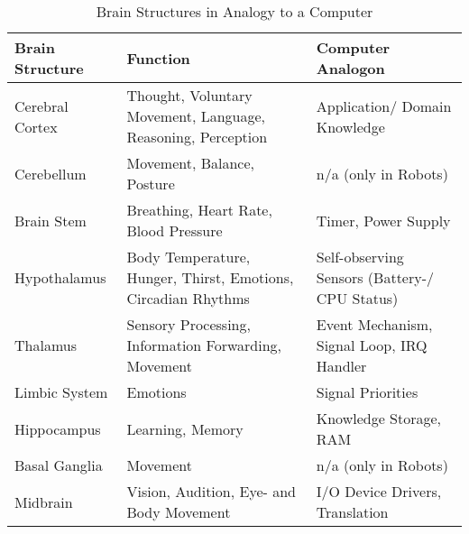 \begin{table}[ht]
    \begin{center}
        \begin{footnotesize}
        \begin{tabular}{| p{25mm} | p{50mm} | p{30mm} |}
            \hline
            \textbf{Brain Structure} & \textbf{Function} & \textbf{Computer Analogon}\\
            \hline
            Cerebral Cortex
            & Thought, Voluntary Movement, Language, Reasoning, Perception
            & Application/ Domain Knowledge\\
            \hline
            Cerebellum
            & Movement, Balance, Posture
            & n/a (only in Robots)\\
            \hline
            Brain Stem %
            & Breathing, Heart Rate, Blood Pressure
            & Timer, Power Supply\\
            \hline
            Hypothalamus
            & Body Temperature, Hunger, Thirst, Emotions, Circadian Rhythms
            & Self-observing Sensors (Battery-/ CPU Status)\\
            \hline
            Thalamus
            & Sensory Processing, Information Forwarding, Movement
            & Event Mechanism, Signal Loop, IRQ Handler\\
            \hline
            Limbic System %
            & Emotions
            & Signal Priorities\\
            \hline
            Hippocampus
            & Learning, Memory
            & Knowledge Storage, RAM\\
            \hline
            Basal Ganglia %
            & Movement
            & n/a (only in Robots)\\
            \hline
            Midbrain %
            & Vision, Audition, Eye- and Body Movement
            & I/O Device Drivers, Translation\\
            \hline
        \end{tabular}
        \end{footnotesize}
        \caption{Brain Structures in Analogy to a Computer \cite{adventuresinneuroanatomy}}
        \label{brainstructures_table}
    \end{center}
\end{table}


